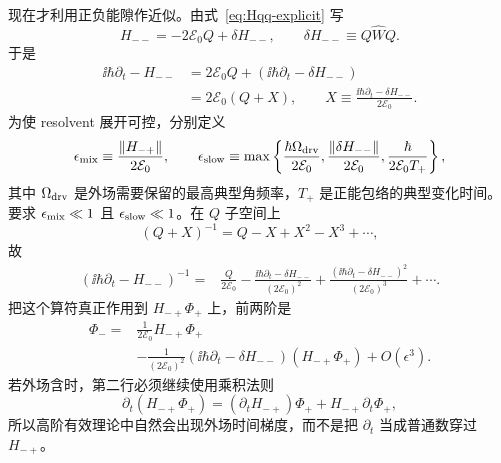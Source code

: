 现在才利用正负能隙作近似。由式~\eqref{eq:Hqq-explicit} 写
\begin{equation}
H_{--}=-2\mathcal E_0Q+\delta H_{--},
\qquad
\delta H_{--}\equiv Q\widehat WQ.
\end{equation}
于是
\begin{align}
\ii\hbar\partial_t-H_{--}
&=2\mathcal E_0Q+
\left(\ii\hbar\partial_t-\delta H_{--}\right)\\
&=2\mathcal E_0(Q+X),
\qquad
X\equiv
\frac{\ii\hbar\partial_t-\delta H_{--}}{2\mathcal E_0}.
\label{eq:Feshbach-X-def}
\end{align}
为使 resolvent 展开可控，分别定义
\begin{equation}
 \epsilon_{\rm mix}\equiv
 \frac{\|H_{-+}\|}{2\mathcal E_0},
 \qquad
 \epsilon_{\rm slow}\equiv
 \max\left\{
 \frac{\hbar\Omega_{\rm drv}}{2\mathcal E_0},
 \frac{\|\delta H_{--}\|}{2\mathcal E_0},
 \frac{\hbar}{2\mathcal E_0T_+}
 \right\},
 \label{eq:Feshbach-smallparameters}
\end{equation}
其中 $\Omega_{\rm drv}$ 是外场需要保留的最高典型角频率，$T_+$ 是正能包络的典型变化时间。要求
$\epsilon_{\rm mix}\ll1$ 且 $\epsilon_{\rm slow}\ll1$。在 $Q$ 子空间上
\begin{equation}
(Q+X)^{-1}=Q-X+X^2-X^3+\cdots,
\end{equation}
故
\begin{align}
\left(\ii\hbar\partial_t-H_{--}\right)^{-1}
={}&\frac{Q}{2\mathcal E_0}
-\frac{\ii\hbar\partial_t-\delta H_{--}}{(2\mathcal E_0)^2}
+\frac{(\ii\hbar\partial_t-\delta H_{--})^2}{(2\mathcal E_0)^3}
+\cdots .
\label{eq:Feshbach-resolvent-series}
\end{align}
把这个算符真正作用到 $H_{-+}\Phi_+$ 上，前两阶是
\begin{align}
\Phi_-
={}&\frac{1}{2\mathcal E_0}H_{-+}\Phi_+\\
&-\frac{1}{(2\mathcal E_0)^2}
\left(\ii\hbar\partial_t-\delta H_{--}\right)
\left(H_{-+}\Phi_+\right)
+O(\epsilon^3).
\label{eq:Feshbach-negative-next}
\end{align}
若外场含时，第二行必须继续使用乘积法则
\begin{equation}
\partial_t(H_{-+}\Phi_+)
=(\partial_tH_{-+})\Phi_+ +H_{-+}\partial_t\Phi_+,
\label{eq:Feshbach-product-rule}
\end{equation}
所以高阶有效理论中自然会出现外场时间梯度，而不是把 $\partial_t$ 当成普通数穿过 $H_{-+}$。

